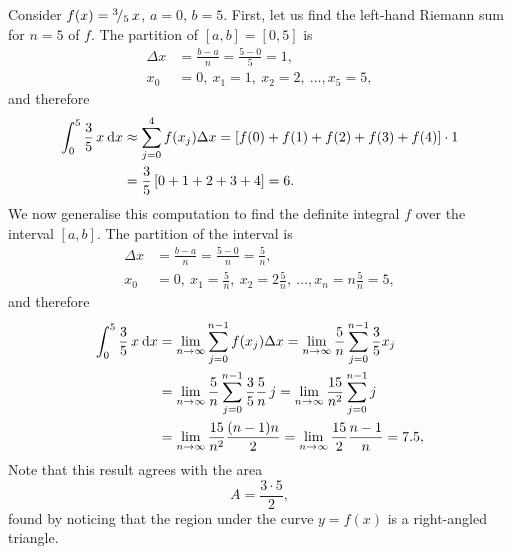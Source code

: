 \begin{example}
Consider $f(x)=	{}^{3}\!/_{5} \, x$, $a=0$, $b=5$. First, let us find the left-hand Riemann sum for $n=5$ of $f$. The partition of $[a,b]=[0,5]$ is
\begin{equation*}
\begin{split}
\Delta x &= \frac{b-a}{n} = \frac{5-0}{5} = 1,\\
x_0 &= 0, \: x_1 = 1, \: x_2 = 2, \: \dots, x_5 = 5,
\end{split}
\end{equation*}
and therefore
\begin{equation*}
\begin{split}
\int_{0}^{5} \frac{3}{5} \, x \: \mathrm{d} x & \approx \sum_{j=0}^4 f(x_j) \Delta x 
= [f(0)+f(1)+f(2)+f(3)+f(4)] \cdot 1 \\
& = \frac35 \, [0+1+2+3+4] = 6.
\end{split}
\end{equation*}
We now generalise this computation to find the definite integral $f$ over the interval $[a,b]$.
The partition of the interval is
\begin{equation*}
\begin{split}
\Delta x &= \frac{b-a}{n} = \frac{5-0}{n} = \frac{5}{n},\\
x_0 &= 0, \: x_1 = \frac{5}{n}, \: x_2 = 2\frac{5}{n}, \: \dots, x_n = n\frac{5}{n}=5,
\end{split}
\end{equation*}
and therefore
\begin{equation*}
\begin{split}
\int_{0}^{5} \frac{3}{5} \, x \: \mathrm{d} x & = \lim_{n \to \infty} \sum_{j=0}^{n-1} f(x_j) \Delta x 
= \lim_{n \to \infty} \frac{5}{n} \sum_{j=0}^{n-1} \frac{3}{5} x_j  \\
& = \lim_{n \to \infty} \frac{5}{n} \sum_{j=0}^{n-1} \frac{3}{5} \frac{5}{n} \, j
= \lim_{n \to \infty} \frac{15}{n^2} \sum_{j=0}^{n-1} j \\
& = \lim_{n \to \infty} \frac{15}{n^2} \frac{(n-1)n}{2}
= \lim_{n \to \infty} \frac{15}{2} \frac{n-1}{n} = 7.5,
\end{split}
\end{equation*}
Note that this result agrees with the area
\[ A = \frac{3\cdot5}{2}, \]
found by noticing that the region under the curve $y=f(x)$ is a right-angled triangle.
\end{example}

